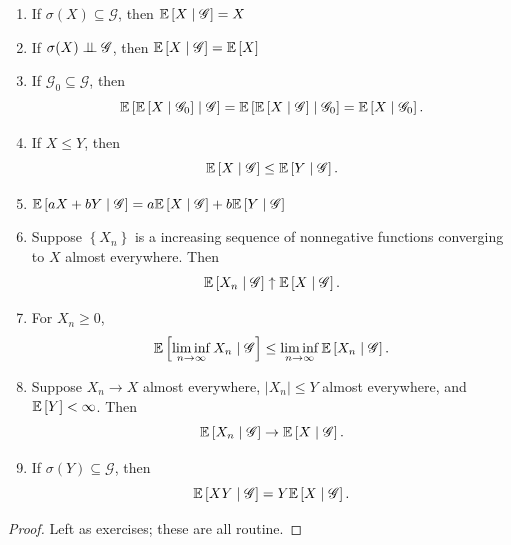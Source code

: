 \begin{proposition}
	\begin{enumerate}[label = (\roman*)]
		\item If $\sigma(X) \subseteq \mathscr{G}$, then $\mathbb{E}\left[X \mid \mathscr{G}\right] = X$ 
		\item If $\sigma(X) \perp\!\!\!\perp \mathscr{G}$, then $\mathbb{E}\left[X \mid \mathscr{G}\right] = \mathbb{E}\left[X\right] $
		\item If $\mathscr{G}_0 \subseteq \mathscr{G}$, then \[
				\mathbb{E}\left[\mathbb{E}\left[X \mid \mathscr{G}_0\right] \mid \mathscr{G}\right] = \mathbb{E}\left[\mathbb{E}\left[X \mid \mathscr{G}\right] \mid \mathscr{G}_0\right] = \mathbb{E}\left[X \mid \mathscr{G}_0\right] 
		.\] 
		\item If $X \le Y$, then \[
			\mathbb{E}\left[X \mid \mathscr{G}\right] \le \mathbb{E}\left[Y \mid \mathscr{G}\right] 
		.\]
		\item $\mathbb{E}\left[aX + bY \mid \mathscr{G}\right] = a\mathbb{E}\left[X \mid \mathscr{G}\right] + b\mathbb{E}\left[Y \mid \mathscr{G}\right] $
		\item Suppose $\left\{X_n\right\}$ is a increasing sequence of nonnegative functions converging to $X$ almost everywhere. Then \[
			\mathbb{E}\left[X_n \mid \mathscr{G}\right]  \uparrow \mathbb{E}\left[X \mid \mathscr{G}\right] 
		.\] 
		\item For $X_n \ge 0$, \[
			\mathbb{E}\left[\liminf\limits_{n \to \infty} X_n \mid \mathscr{G}\right] \le \liminf\limits_{n \to \infty} \mathbb{E}\left[X_n \mid \mathscr{G}\right] 
		.\] 
		\item Suppose $X_n \to X$ almost everywhere, $\left| X_n \right|\le Y$ almost everywhere, and $\mathbb{E}\left[Y\right] < \infty$. Then \[
			\mathbb{E}\left[X_n \mid \mathscr{G}\right] \to \mathbb{E}\left[X \mid \mathscr{G}\right] 
		.\] 
		\item If $\sigma(Y) \subseteq  \mathscr{G}$, then \[
			\mathbb{E}\left[XY \mid \mathscr{G}\right] = Y \mathbb{E}\left[X \mid \mathscr{G}\right] 
		.\] 
	\end{enumerate}
\end{proposition}
\begin{proof}
	Left as exercises; these are all routine.
\end{proof}
